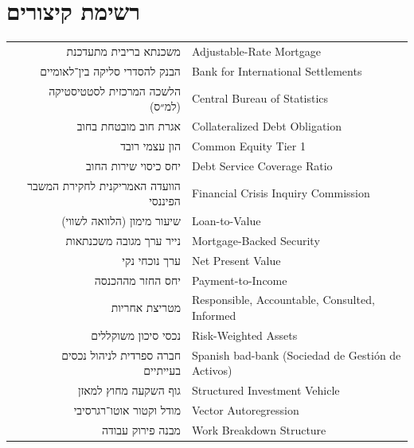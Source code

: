 \chapter*{רשימת קיצורים}

\begin{center}
\begin{tabularx}{\tabmaxwidth}{>{\raggedleft\arraybackslash}p{1.6cm} R E}
\toprule
{} &  &  \\
\midrule
{}  & משכנתא בריבית מתעדכנת & Adjustable-Rate Mortgage \\
  & הבנק להסדרי סליקה בין־לאומיים & Bank for International Settlements \\
  & הלשכה המרכזית לסטטיסטיקה (למ״ס) & Central Bureau of Statistics \\
  & אגרת חוב מובטחת בחוב & Collateralized Debt Obligation \\
 & הון עצמי רובד  & Common Equity Tier 1 \\
 & יחס כיסוי שירות החוב & Debt Service Coverage Ratio \\
 & הוועדה האמריקנית לחקירת המשבר הפיננסי & Financial Crisis Inquiry Commission \\
  & שיעור מימון (הלוואה לשווי) & Loan-to-Value \\
  & נייר ערך מגובה משכנתאות & Mortgage-Backed Security \\
  & ערך נוכחי נקי & Net Present Value \\
  & יחס החזר מההכנסה & Payment-to-Income \\
 & מטריצת אחריות & Responsible, Accountable, Consulted, Informed \\
 & נכסי סיכון משוקללים & Risk-Weighted Assets \\
 & חברה ספרדית לניהול נכסים בעייתיים & Spanish bad-bank (Sociedad de Gestión de Activos) \\
 & גוף השקעה מחוץ למאזן & Structured Investment Vehicle \\
  & מודל וקטור אוטו־רגרסיבי & Vector Autoregression \\
  & מבנה פירוק עבודה & Work Breakdown Structure \\
\bottomrule
\end{tabularx}
\end{center}
